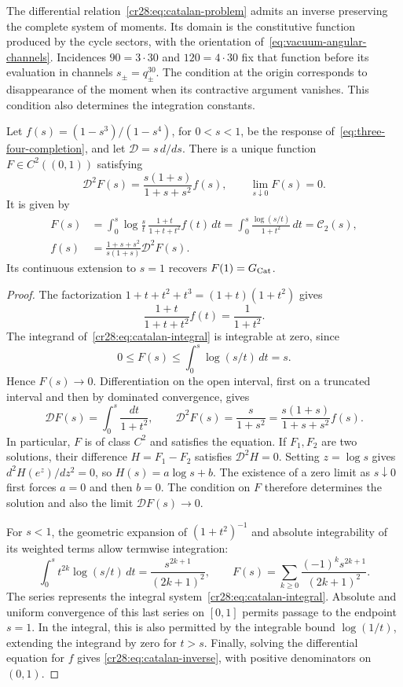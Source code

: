 The differential relation~\eqref{cr28:eq:catalan-problem} admits an inverse preserving the complete system of moments. Its domain is the constitutive function produced by the cycle sectors, with the orientation of~\eqref{eq:vacuum-angular-channels}. Incidences $90=3\cdot30$ and $120=4\cdot30$ fix that function before its evaluation in channels $s_\pm=q_\pm^{30}$. The condition at the origin corresponds to disappearance of the moment when its contractive argument vanishes. This condition also determines the integration constants.

\begin{theorem}
\label{cr28:thm:catalan-recovery}
Let $f(s)=(1-s^3)/(1-s^4)$, for $0<s<1$, be the response
of~\eqref{eq:three-four-completion}, and let $\mathcal D=s\,d/ds$.
There is a unique function $F\in C^2((0,1))$ satisfying
\begin{equation}
 \mathcal D^2F(s)=\frac{s(1+s)}{1+s+s^2}f(s),
 \qquad \lim_{s\downarrow0}F(s)=0.
 \label{cr28:eq:catalan-problem}
\end{equation}
It is given by
\begin{align}
 F(s)&=\int_0^s\log\frac{s}{t}\,
          \frac{1+t}{1+t+t^2}f(t)\,dt
       =\int_0^s\frac{\log(s/t)}{1+t^2}\,dt
       =\mathcal C_2(s),
 \label{cr28:eq:catalan-integral}\\
 f(s)&=\frac{1+s+s^2}{s(1+s)}\mathcal D^2F(s).
 \label{cr28:eq:catalan-inverse}
\end{align}
Its continuous extension to $s=1$ recovers $F(1)=G_{\rm Cat}$.
\end{theorem}
\begin{proof}
The factorization $1+t+t^2+t^3=(1+t)(1+t^2)$ gives
\[
 \frac{1+t}{1+t+t^2}f(t)=\frac1{1+t^2}.
\]
The integrand of~\eqref{cr28:eq:catalan-integral} is
integrable at zero, since
\[
 0\leq F(s)\leq\int_0^s\log(s/t)\,dt=s.
\]
Hence $F(s)\to0$. Differentiation on the open interval,
first on a truncated interval and then by dominated convergence,
gives
\[
 \mathcal DF(s)=\int_0^s\frac{dt}{1+t^2},
 \qquad \mathcal D^2F(s)=\frac{s}{1+s^2}
     =\frac{s(1+s)}{1+s+s^2}f(s).
\]
In particular, $F$ is of class $C^2$ and satisfies the equation.
If $F_1,F_2$ are two solutions, their difference $H=F_1-F_2$
satisfies $\mathcal D^2H=0$. Setting $z=\log s$ gives
$d^2H(e^z)/dz^2=0$, so $H(s)=a\log s+b$.
The existence of a zero limit as $s\downarrow0$ first forces
$a=0$ and then $b=0$. The condition on $F$ therefore determines
the solution and also the limit $\mathcal DF(s)\to0$.

For $s<1$, the geometric expansion of $(1+t^2)^{-1}$ and
absolute integrability of its weighted terms allow termwise integration:
\[
 \int_0^s t^{2k}\log(s/t)\,dt
     =\frac{s^{2k+1}}{(2k+1)^2},\qquad
 F(s)=\sum_{k\geq0}\frac{(-1)^ks^{2k+1}}{(2k+1)^2}.
\]
The series represents the integral system~\eqref{cr28:eq:catalan-integral}. Absolute and uniform convergence of this last series on $[0,1]$ permits passage to the endpoint $s=1$. In the integral, this is also permitted by the integrable bound $\log(1/t)$, extending the integrand by zero for $t>s$. Finally, solving the differential equation for $f$ gives \eqref{cr28:eq:catalan-inverse}, with positive denominators on $(0,1)$.
\end{proof}

